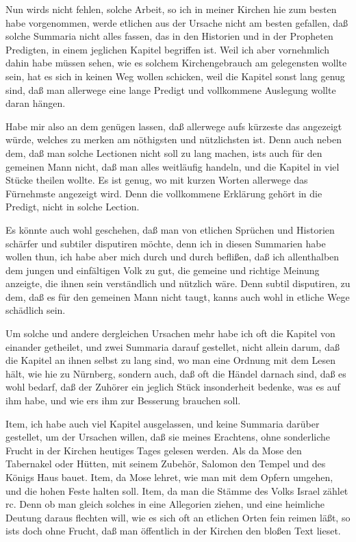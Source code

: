 Nun wirds nicht fehlen, solche Arbeit, so ich in meiner Kirchen hie zum besten habe vorgenommen, werde etlichen aus der Ursache nicht am besten gefallen, daß solche Summaria nicht alles fassen, das in den Historien und in der Propheten Predigten, in einem jeglichen Kapitel begriffen ist. Weil ich aber vornehmlich dahin habe müssen sehen, wie es solchem Kirchengebrauch am gelegensten wollte sein, hat es sich in keinen Weg wollen schicken, weil die Kapitel sonst lang genug sind, daß man allerwege eine lange Predigt und vollkommene Auslegung wollte daran hängen.

Habe mir also an dem genügen lassen, daß allerwege aufs kürzeste das angezeigt würde, welches zu merken am nöthigsten und nützlichsten ist. Denn auch neben dem, daß man solche Lectionen nicht soll zu lang machen, ists auch für den gemeinen Mann nicht, daß man alles weitläufig handeln, und die Kapitel in viel Stücke theilen wollte. Es ist genug, wo mit kurzen Worten allerwege das Fürnehmste angezeigt wird. Denn die vollkommene Erklärung gehört in die Predigt, nicht in solche Lection.

Es könnte auch wohl geschehen, daß man von etlichen Sprüchen und Historien schärfer und subtiler disputiren möchte, denn ich in diesen Summarien habe wollen thun, ich habe aber mich durch und durch beflißen, daß ich allenthalben dem jungen und einfältigen Volk zu gut, die gemeine und richtige Meinung anzeigte, die ihnen sein verständlich und nützlich wäre. Denn subtil disputiren, zu dem, daß es für den gemeinen Mann nicht taugt, kanns auch wohl in etliche Wege schädlich sein.

Um solche und andere dergleichen Ursachen mehr habe ich oft die Kapitel von einander getheilet, und zwei Summaria darauf gestellet, nicht allein darum, daß die Kapitel an ihnen selbst zu lang sind, wo man eine Ordnung mit dem Lesen hält, wie hie zu Nürnberg, sondern auch, daß oft die Händel darnach sind, daß es wohl bedarf, daß der Zuhörer ein jeglich Stück insonderheit bedenke, was es auf ihm habe, und wie ers ihm zur Besserung brauchen soll.

Item, ich habe auch viel Kapitel ausgelassen, und keine Summaria darüber gestellet, um der Ursachen willen, daß sie meines Erachtens, ohne sonderliche Frucht in der Kirchen heutiges Tages gelesen werden. Als da Mose den Tabernakel oder Hütten, mit seinem Zubehör, Salomon den Tempel und des Königs Haus bauet. Item, da Mose lehret, wie man mit dem Opfern umgehen, und die hohen Feste halten soll. Item, da man die Stämme des Volks Israel zählet rc. Denn ob man gleich solches in eine Allegorien ziehen, und eine heimliche Deutung daraus flechten will, wie es sich oft an etlichen Orten fein reimen läßt, so ists doch ohne Frucht, daß man öffentlich in der Kirchen den bloßen Text lieset.

